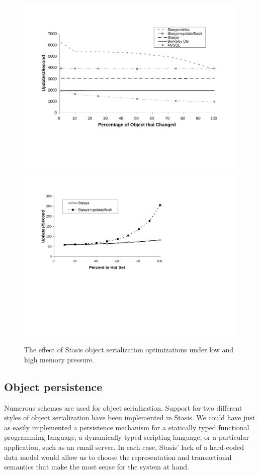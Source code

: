 \documentclass[letterpaper,twocolumn,10pt]{article}
\newcommand{\yad}{Stasis\xspace}
\newcommand{\yads}{Stasis'\xspace}
\begin{document}
\begin{figure}
\includegraphics[width=1\columnwidth]{figs/object-diff.pdf}
\hspace{.2in}
\includegraphics[width=1\columnwidth]{figs/mem-pressure.pdf}
\vspace{-.15in}
\caption{\sf \label{fig:OASYS}
The effect of \yad object serialization optimizations under low and high memory pressure.}
\end{figure}

\subsection{Object persistence}
\label{sec:oasys}
Numerous schemes are used for object serialization.  Support for two
different styles of object serialization have been implemented in
\yad.  We could have just as easily implemented a persistence
mechanism for a statically typed functional programming language, a
dynamically typed scripting language, or a particular application,
such as an email server.  In each case, \yads lack of a hard-coded data
model would allow us to choose the representation and transactional
semantics that make the most sense for the system at hand.
\end{document}
